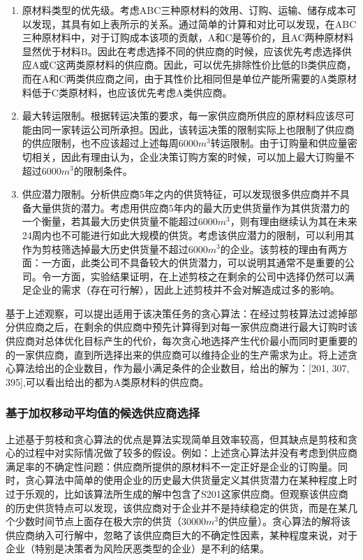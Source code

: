 \documentclass{my_paper}
\begin{document}
\begin{enumerate}


\item 原材料类型的优先级。考虑ABC三种原材料的效用、订购、运输、储存成本可以发现，其具有如上表所示的关系。通过简单的计算和对比可以发现，在ABC三种原材料中，对于订购成本该项的贡献，A和C是等价的，且AC两种原材料显然优于材料B。因此在考虑选择不同的供应商的时候，应该优先考虑选择供应A或C这两类原材料的供应商。因此，可以优先排除性价比低的B类供应商，而在A和C两类供应商之间，由于其性价比相同但是单位产能所需要的A类原材料低于C类原材料，也应该优先考虑A类供应商。

\item 最大转运限制。根据转运决策的要求，每一家供应商所供应的原材料应该尽可能由同一家转运公司所承担。因此，该转运决策的限制实际上也限制了供应商的供应限制，也不应该超过上述每周6000$m^3$转运限制。由于订购量和供应量密切相关，因此有理由认为，企业决策订购方案的时候，可以加上最大订购量不超过6000$m^3$的限制条件。

\item 供应潜力限制。分析供应商5年之内的供货特征，可以发现很多供应商并不具备大量供货的潜力。考虑用供应商5年内的最大历史供货量作为其供货潜力的一个衡量，若其最大历史供货量不能超过6000$m^3$，则有理由继续认为其在未来24周内也不可能进行如此大规模的供货。考虑该供应潜力的限制，可以利用其作为剪枝筛选掉最大历史供货量不超过6000$m^3$的企业。该剪枝的理由有两方面：一方面，此类公司不具备较大的供货潜力，可以说明其通常不是重要的公司。令一方面，实验结果证明，在上述剪枝之在剩余的公司中选择仍然可以满足企业的需求（存在可行解），因此上述剪枝并不会对解造成过多的影响。

\end{enumerate}

基于上述观察，可以提出适用于该决策任务的贪心算法：在经过剪枝算法过滤掉部分供应商之后，在剩余的供应商中预先计算得到对每一家供应商进行最大订购时该供应商对总体优化目标产生的代价，每次贪心地选择产生代价最小而同时更重要的的一家供应商，直到所选择出来的供应商可以维持企业的生产需求为止。将上述贪心算法给出的企业数目，作为最小满足条件的企业数目，给出的解为：[201, 307, 395],可以看出给出的都为A类原材料的供应商。

\subsubsection{基于加权移动平均值的候选供应商选择}

上述基于剪枝和贪心算法的优点是算法实现简单且效率较高，但其缺点是剪枝和贪心的过程中对实际情况做了较多的假设。例如：上述贪心算法并没有考虑到供应商满足率的不确定性问题：供应商所提供的原材料不一定正好是企业的订购量。同时，贪心算法中简单的使用企业的历史最大供货量定义其供货潜力在某种程度上时过于乐观的，比如该算法所生成的解中包含了S201这家供应商。但观察该供应商的历史供货特点可以发现，该供应商对于企业并不是持续稳定的供货，而是在某几个少数时间节点上面存在极大宗的供货（30000$m^3$的供应量）。贪心算法的解将该供应商纳入可行解中，忽略了该供应商巨大的不确定性因素，某种程度来说，对于企业（特别是决策者为风险厌恶类型的企业）是不利的结果。
\end{document}
